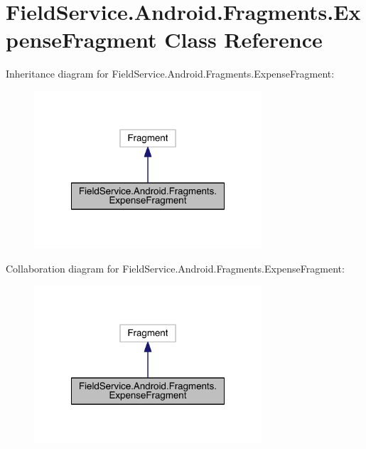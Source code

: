 \hypertarget{class_field_service_1_1_android_1_1_fragments_1_1_expense_fragment}{\section{Field\+Service.\+Android.\+Fragments.\+Expense\+Fragment Class Reference}
\label{class_field_service_1_1_android_1_1_fragments_1_1_expense_fragment}
}


Inheritance diagram for Field\+Service.\+Android.\+Fragments.\+Expense\+Fragment\+:
\nopagebreak
\begin{figure}[H]
\begin{center}
\leavevmode
\includegraphics[width=240pt]{class_field_service_1_1_android_1_1_fragments_1_1_expense_fragment__inherit__graph}
\end{center}
\end{figure}


Collaboration diagram for Field\+Service.\+Android.\+Fragments.\+Expense\+Fragment\+:
\nopagebreak
\begin{figure}[H]
\begin{center}
\leavevmode
\includegraphics[width=240pt]{class_field_service_1_1_android_1_1_fragments_1_1_expense_fragment__coll__graph}
\end{center}
\end{figure}
